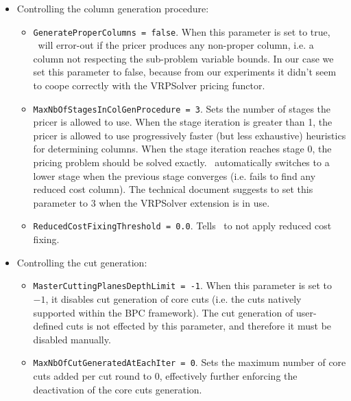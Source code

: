 \begin{itemize}
	\item Controlling the column generation procedure:
	      \begin{itemize}
		      \item \texttt{GenerateProperColumns = false}.
		            When this parameter is set to true, \bapcod\ will error-out if the pricer produces any non-proper column,
		            i.e. a column not respecting the sub-problem variable bounds.
		            In our case we set this parameter to false, because from our experiments it didn't seem to coope correctly with the VRPSolver pricing functor.
		      \item \texttt{MaxNbOfStagesInColGenProcedure = 3}.
		            Sets the number of stages the pricer is allowed to use.
		            When the stage iteration is greater than 1, the pricer is allowed to use
		            progressively faster (but less exhaustive) heuristics for determining columns.
		            When the stage iteration reaches stage 0, the pricing problem should be solved exactly.
		            \bapcod\ automatically switches to a lower stage when the previous stage converges (i.e. fails to find any reduced cost column).
		            The technical document suggests to set this parameter to $3$ when the VRPSolver extension is in use.
		      \item \texttt{ReducedCostFixingThreshold = 0.0}.
		            Tells \bapcod\ to not apply reduced cost fixing.
	      \end{itemize}

	\item Controlling the cut generation:
	      \begin{itemize}
		      \item \texttt{MasterCuttingPlanesDepthLimit = -1}.
		            When this parameter is set to $-1$, it disables cut generation of core cuts
		            (i.e. the cuts natively supported within the BPC framework).
		            The cut generation of user-defined cuts
		            is not effected by this parameter, and therefore it must be disabled manually.
		      \item \texttt{MaxNbOfCutGeneratedAtEachIter = 0}.
		            Sets the maximum number of core cuts added per cut round to $0$,
		            effectively further enforcing the deactivation of the core cuts generation.
	      \end{itemize}


\end{itemize}
